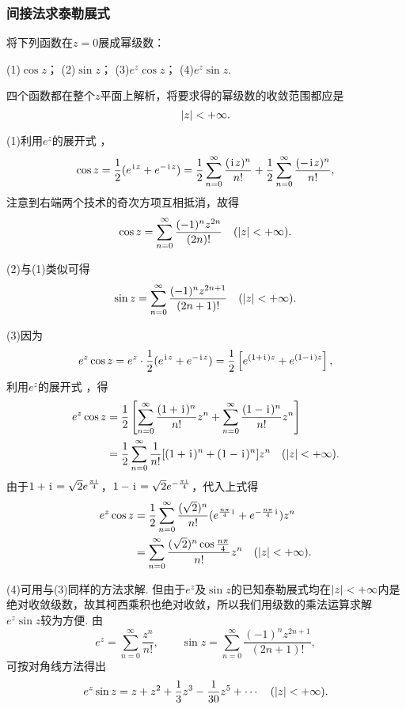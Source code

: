 \subsubsection{间接法求泰勒展式}
\begin{example}
将下列函数在\(z = 0\)展成幂级数：

(1)\(\cos z\)； \hfill (2)\(\sin z\)； \hfill (3)\(e^z \cos z\)； \hfill (4)\(e^z \sin z\).
\begin{solution}
四个函数都在整个\(z\)平面上解析，将要求得的幂级数的收敛范围都应是\[
\abs{z}<+\infty.
\]

(1)利用\(e^z\)的展开式 ，\[
\cos z = \frac{1}{2} (e^{\kern1pt\mathrm{i}\kern1pt z} + e^{-\kern1pt\mathrm{i}\kern1pt z})
= \frac{1}{2} \sum_{n=0}^\infty \frac{(\kern1pt\mathrm{i}\kern1pt z)^n}{n!} + \frac{1}{2} \sum_{n=0}^\infty \frac{(-\kern1pt\mathrm{i}\kern1pt z)^n}{n!},
\]注意到右端两个技术的奇次方项互相抵消，故得\begin{equation}\label{equation:解析函数的级数表示.余弦函数的泰勒展式}
\cos z = \sum_{n=0}^\infty \frac{(-1)^n z^{2n}}{(2n)!} \quad(\abs{z}<+\infty).
\end{equation}

(2)与(1)类似可得\begin{equation}\label{equation:解析函数的级数表示.正弦函数的泰勒展式}
\sin z = \sum_{n=0}^\infty \frac{(-1)^n z^{2n+1}}{(2n+1)!} \quad(\abs{z}<+\infty).
\end{equation}

(3)因为\[
e^z \cos z = e^z \cdot \frac{1}{2} (e^{\kern1pt\mathrm{i}\kern1pt z} + e^{-\kern1pt\mathrm{i}\kern1pt z})
= \frac{1}{2} \left[e^{(1+\kern1pt\mathrm{i}\kern1pt)z} + e^{(1-\kern1pt\mathrm{i}\kern1pt)z}\right],
\]利用\(e^z\)的展开式 ，得\begin{align*}
e^z \cos z
&= \frac{1}{2} \left[
\sum_{n=0}^\infty \frac{(1+\kern1pt\mathrm{i}\kern1pt)^n}{n!} z^n
+ \sum_{n=0}^\infty \frac{(1-\kern1pt\mathrm{i}\kern1pt)^n}{n!} z^n
\right] \\
&= \frac{1}{2} \sum_{n=0}^\infty \frac{1}{n!} [(1+\kern1pt\mathrm{i}\kern1pt)^n+(1-\kern1pt\mathrm{i}\kern1pt)^n] z^n
\quad(\abs{z}<+\infty).
\end{align*}
由于\(1+\kern1pt\mathrm{i}\kern1pt=\sqrt{2} e^{\frac{\pi\kern1pt\mathrm{i}\kern1pt}{4}}\)，\(1-\kern1pt\mathrm{i}\kern1pt=\sqrt{2} e^{-\frac{\pi\kern1pt\mathrm{i}\kern1pt}{4}}\)，代入上式得\begin{equation}
\begin{split}
e^z \cos z
&= \frac{1}{2} \sum_{n=0}^\infty \frac{(\sqrt{2})^n}{n!} (e^{\frac{n\pi}{4}\kern1pt\mathrm{i}\kern1pt}+e^{-\frac{n\pi}{4}\kern1pt\mathrm{i}\kern1pt}) z^n \\
&= \sum_{n=0}^\infty \frac{(\sqrt{2})^n \cos\frac{n\pi}{4}}{n!} z^n
\quad(\abs{z}<+\infty).
\end{split}
\end{equation}

(4)可用与(3)同样的方法求解.
但由于\(e^z\)及\(\sin z\)的已知泰勒展式均在\(\abs{z}<+\infty\)内是绝对收敛级数，故其柯西乘积也绝对收敛，所以我们用级数的乘法运算求解\(e^z \sin z\)较为方便.
由\[
e^z = \sum_{n=0}^\infty \frac{z^n}{n!},
\qquad
\sin z = \sum_{n=0}^\infty \frac{(-1)^n z^{2n+1}}{(2n+1)!},
\]可按对角线方法得出\[
e^z \sin z
= z + z^2 + \frac{1}{3} z^3 - \frac{1}{30} z^5 + \dotsb
\quad(\abs{z}<+\infty).
\]
\end{solution}
\end{example}

